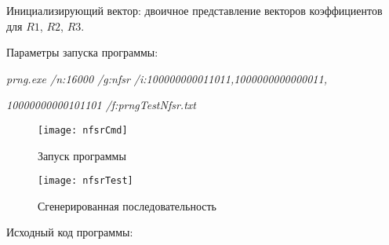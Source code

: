 \documentclass[bachelor, och, coursework]{shiza}
\begin{document}
	Инициализирующий вектор: двоичное представление векторов коэффициентов для $R1$, $R2$, $R3$.
	
	Параметры запуска программы:
	
	\textit{prng.exe /n:16000 /g:nfsr /i:100000000011011,1000000000000011,} 
	
	\textit{10000000000101101 /f:prngTestNfsr.txt}

	\begin{figure}[H]
		\centering
		\texttt{[image: nfsrCmd]}
		\caption{Запуск программы}
		\label{fig:nfsrCmd}
	\end{figure}
	
	\begin{figure}[H]
		\centering
		\texttt{[image: nfsrTest]}
		\caption{Сгенерированная последовательность}
		\label{fig:nfsrTest}
	\end{figure}

		Исходный код программы:
	
\end{document}
